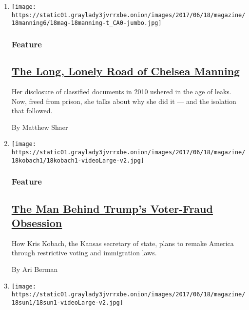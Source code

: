 \begin{enumerate}
\def\labelenumi{\arabic{enumi}.}
\item
  \texttt{[image: https://static01.graylady3jvrrxbe.onion/images/2017/06/18/magazine/18manning6/18mag-18manning-t\_CA0-jumbo.jpg]}

  \hypertarget{feature}{%
  \subsubsection{Feature}\label{feature}}

  \hypertarget{the-long-lonely-road-of-chelsea-manning}{%
  \subsection{\texorpdfstring{\href{/2017/06/12/magazine/the-long-lonely-road-of-chelsea-manning.html}{The
  Long, Lonely Road of Chelsea
  Manning}}{The Long, Lonely Road of Chelsea Manning}}\label{the-long-lonely-road-of-chelsea-manning}}

  Her disclosure of classified documents in 2010 ushered in the age of
  leaks. Now, freed from prison, she talks about why she did it --- and
  the isolation that followed.

  By Matthew Shaer
\item
  \texttt{[image: https://static01.graylady3jvrrxbe.onion/images/2017/06/18/magazine/18kobach1/18kobach1-videoLarge-v2.jpg]}

  \hypertarget{feature-1}{%
  \subsubsection{Feature}\label{feature-1}}

  \hypertarget{the-man-behind-trumps-voter-fraud-obsession}{%
  \subsection{\texorpdfstring{\href{/2017/06/13/magazine/the-man-behind-trumps-voter-fraud-obsession.html}{The
  Man Behind Trump's Voter-Fraud
  Obsession}}{The Man Behind Trump's Voter-Fraud Obsession}}\label{the-man-behind-trumps-voter-fraud-obsession}}

  How Kris Kobach, the Kansas secretary of state, plans to remake
  America through restrictive voting and immigration laws.

  By Ari Berman
\item
  \texttt{[image: https://static01.graylady3jvrrxbe.onion/images/2017/06/18/magazine/18sun1/18sun1-videoLarge-v2.jpg]}


\end{enumerate}
